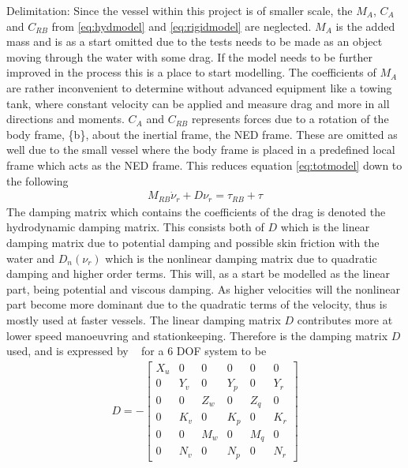 Delimitation:
Since the vessel within this project is of smaller scale, the $M_A$, $C_A$ and $C_{RB}$ from \ref{eq:hydmodel} and \ref{eq:rigidmodel} are neglected. $M_A$ is the added mass and is as a start omitted due to the tests needs to be made as an object moving through the water with some drag. If the model needs to be further improved in the process this is a place to start modelling. The coefficients of $M_A$ are rather inconvenient to determine without advanced equipment like a towing tank, where constant velocity can be applied and measure drag and more in all directions and moments. $C_A$ and $C_{RB}$ represents forces due to a rotation of the body frame, \{b\}, about the inertial frame, the NED frame. These are omitted as well due to the small vessel where the body frame is placed in a predefined local frame which acts as the NED frame. This reduces equation \ref{eq:totmodel} down to the following
\begin{align}
M_{RB} \dot \nu_r + D\nu_r = \tau_{RB} + \tau
\label{eq:reducedmodel}
\end{align}
The damping matrix which contains the coefficients of the drag is denoted the hydrodynamic damping matrix. This consists both of $D$ which is the linear damping matrix due to potential damping and possible skin friction with the water and $D_n(\nu_r)$ which is the nonlinear damping matrix due to quadratic damping and higher order terms.  This will, as a start be modelled as the linear part, being potential and viscous damping. As higher velocities will the nonlinear part become more dominant due to the quadratic terms of the velocity, thus is mostly used at faster vessels. The linear damping matrix $D$ contributes more at lower speed manoeuvring and stationkeeping. Therefore is the damping matrix $D$ used, and is expressed by ~\citep{fossen} for a 6 \ac{DOF} system to be
\begin{align}
D =-
\begin{bmatrix}
X_u & 0 & 0 & 0 & 0 & 0\\
0 & Y_v & 0 & Y_p & 0 & Y_r\\
0 & 0 & Z_w & 0 & Z_q & 0\\
0 & K_v & 0 & K_p & 0 & K_r\\
0 & 0 & M_w & 0 & M_q & 0\\
0 & N_v & 0 & N_p & 0 & N_r
\end{bmatrix}
\end{align}


